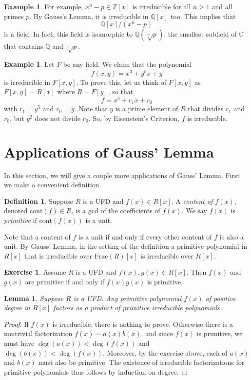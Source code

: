 \documentclass[12pt]{report}
\newtheorem{lemma}[theorem]{Lemma}
\numberwithin{equation}{section}
\numberwithin{theorem}{chapter}
\theoremstyle{definition}
\newtheorem{definition}[theorem]{Definition}
\newtheorem{example}[theorem]{Example}
\newtheorem{exercise}{Exercise}
\newtheorem*{basic properties}{Basic Properties}
\newtheorem*{Important Remark}{Important Remark}
\newcommand{\C}{\mathbb{C}}
\begin{document}
\begin{example}
For example, $x^n - p \in \mathbb{Z}[x]$ is irreducible for all $n \geq 1$ and all primes $p$.
By Gauss's Lemma, it is irreducible in $\mathbb{Q}[x]$ too. This implies that
$$
\mathbb{Q}[x]/(x^n-p)
$$
is a field. In fact, this field is isomorphic to $\mathbb{Q}(\sqrt[n]{p})$, the smallest subfield of $\C$ that contains $\mathbb{Q}$ and  $\sqrt[n]{p}$.
\end{example}


\begin{example} 
Let $F$ be any field.
We claim that the polynomial 
$$f(x,y) = x^3 + y^5 x + y$$ 
is irreducible in $F[x,y]$. To prove this, let us think of $F[x,y]$ as $F[x,y] = R[x]$ where $R = F[y]$, so that 
$$f = x^3 + r_1 x + r_0$$ 
with $r_1 = y^5$ and $r_0 = y$. Note that $y$ is a prime element of $R$ that divides $r_1$ and $r_0$, but $y^2$ does not divide $r_0$. So, by Eisenstein's Criterion, $f$ is irreducible.
\end{example}



\section{Applications of Gauss' Lemma}


In this section, we will give a couple more applications of Gauss' Lemma. First we make a convenient definition.

\begin{definition}Suppose $R$ is a UFD and $f(x) \in R[x]$. A {\em content of $f(x)$}, denoted $\mathrm{cont}(f) \in R$, is a gcd of the coefficients of $f(x)$. We say $f(x)$ is {\em primitive} if $\mathrm{cont}(f(x))$ is a unit.

\end{definition}

Note that a content of $f$ is a unit if and only if every other content of $f$ is also a unit. By Gauss' Lemma, in the setting of the definition a primitive polynomial in $R[x]$ that is irreducible over $\mathrm{Frac}(R)[x]$ is irreducible over $R[x]$.

\begin{exercise}
 Assume $R$ is a UFD and $f(x), g(x) \in R[x]$. 
Then $f(x)$ and $g(x)$ are primitive if and only if  $f(x)
g(x)$ is primitive.
\end{exercise}

\begin{lemma}
Suppose $R$ is a UFD. Any primitive polynomial $f(x)$ of positive degree in $R[x]$ factors as a product of primitive irreducible polynomials.
\end{lemma}
\begin{proof}
If $f(x)$ is irreducible, there is nothing to prove. Otherwise there is a nontrivial factorization $f(x) = a(x) b(x)$,  and since $f(x)$ is primitive,  we must have $\deg(a(x)) <\deg(f(x))$ and $\deg(b(x)) <\deg(f(x))$. Moreover, by the exercise above, each of $a(x)$ and $b(x)$ must also be primitive. The existence of irreducible factorizations for primitive polynomials thus follows by induction on degree. 
\end{proof}
\end{document}
